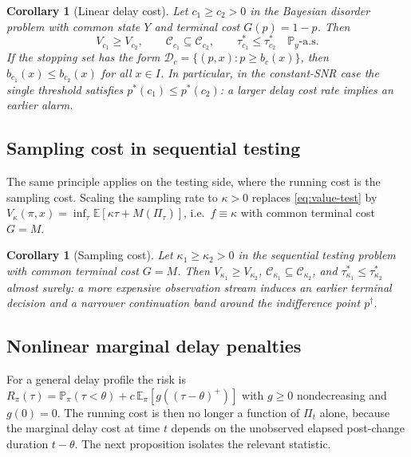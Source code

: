 \documentclass[pdflatex,sn-mathphys-num]{sn-jnl}
\theoremstyle{plain}
\newtheorem{corollary}[theorem]{Corollary}
\theoremstyle{definition}
\newcommand{\E}{\mathbb{E}}
\newcommand{\PR}{\mathbb{P}}
\newcommand{\post}{\Pi}
\begin{document}
\begin{corollary}[Linear delay cost]\label{cor:linear}
Let $c_1\ge c_2>0$ in the Bayesian disorder problem with common state $Y$ and
terminal cost $G(p)=1-p$. Then
\[
  V_{c_1}\ge V_{c_2},\qquad
  \mathcal C_{c_1}\subseteq\mathcal C_{c_2},\qquad
  \tau_{c_1}^\ast\le\tau_{c_2}^\ast\quad\PR_y\text{-a.s.}
\]
If the stopping set has the form $\mathcal D_c=\{(p,x):p\ge b_c(x)\}$, then
$b_{c_1}(x)\le b_{c_2}(x)$ for all $x\in I$. In particular, in the constant-SNR
case the single threshold satisfies $p^\ast(c_1)\le p^\ast(c_2)$: a larger delay
cost rate implies an earlier alarm.
\end{corollary}

\subsection{Sampling cost in sequential testing}\label{sec:sampling}
The same principle applies on the testing side, where the running cost is the
sampling cost. Scaling the sampling rate to $\kappa>0$ replaces
\eqref{eq:value-test} by $V_\kappa(\pi,x)=\inf_\tau\E[\kappa\tau+M(\post_\tau)]$,
i.e.\ $f\equiv\kappa$ with common terminal cost $G=M$.

\begin{corollary}[Sampling cost]\label{cor:sampling}
Let $\kappa_1\ge\kappa_2>0$ in the sequential testing problem with common terminal
cost $G=M$. Then $V_{\kappa_1}\ge V_{\kappa_2}$,
$\mathcal C_{\kappa_1}\subseteq\mathcal C_{\kappa_2}$, and
$\tau_{\kappa_1}^\ast\le\tau_{\kappa_2}^\ast$ almost surely: a more expensive
observation stream induces an earlier terminal decision and a narrower
continuation band around the indifference point $p^\dagger$.
\end{corollary}

\subsection{Nonlinear marginal delay penalties}\label{sec:nonlinear}
For a general delay profile the risk is
$R_\pi(\tau)=\PR_\pi(\tau<\theta)+c\,\E_\pi[g((\tau-\theta)^+)]$ with $g\ge0$
nondecreasing and $g(0)=0$. The running cost is then no longer a function of
$\post_t$ alone, because the marginal delay cost at time $t$ depends on the
unobserved elapsed post-change duration $t-\theta$. The next proposition isolates
the relevant statistic.
\end{document}
